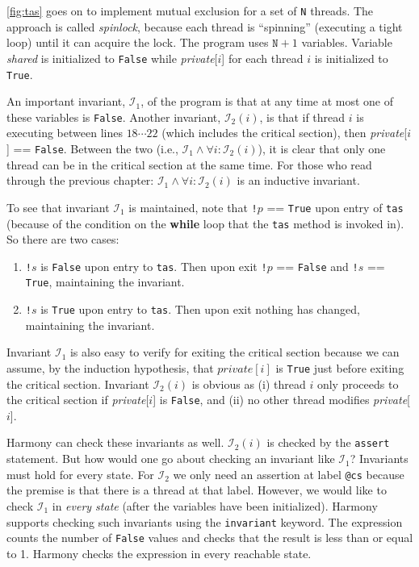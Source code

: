 \documentclass{report}
\begin{document}
\autoref{fig:tas} goes on to implement mutual exclusion for
a set of \texttt{N} threads.
The approach is called \emph{spinlock},
%
because each thread is ``spinning'' (executing a tight loop) until
it can acquire the lock.
The program uses $\mathtt{N}+1$ variables.
Variable \textit{shared} is initialized to \texttt{False} while
\textit{private}[$i$] for each thread $i$ is initialized to \texttt{True}.

An important invariant, $\mathcal{I}_1$, of the program is that at any time at most
one of these variables is \texttt{False}.
Another invariant, $\mathcal{I}_2(i)$, is that if thread $i$ is executing between
lines $18 \cdots 22$ (which includes the critical section),
then \textit{private}[$i$] == \texttt{False}.
Between the two (i.e., $\mathcal{I}_1 \land \forall i: \mathcal{I}_2(i)$),
it is clear that only one thread can be in the
critical section at the same time.
For those who read through the previous chapter:
$\mathcal{I}_1 \land \forall i: \mathcal{I}_2(i)$ is an inductive invariant.

To see that invariant $\mathcal{I}_1$ is maintained, note that
\texttt{!}$p$ == \texttt{True} upon entry of \texttt{tas}
(because of the condition on the \textbf{while} loop that the
\texttt{tas} method is invoked in).
So there are two cases:
\begin{enumerate}
\item \texttt{!}$s$ is \texttt{False} upon entry to \texttt{tas}.
Then upon exit \texttt{!}$p$ == \texttt{False} and \texttt{!}$s$ == \texttt{True},
maintaining the invariant.
\item \texttt{!}$s$ is \texttt{True} upon entry to \texttt{tas}.
Then upon exit nothing has changed, maintaining the invariant.
\end{enumerate}
Invariant $\mathcal{I}_1$ is also easy to verify for exiting the critical section
because we can assume, by the induction hypothesis, that $\textit{private}[i]$ is
\texttt{True} just before exiting the critical section.
Invariant $\mathcal{I}_2(i)$ is obvious as (i) thread $i$ only proceeds to the critical
section if \textit{private}[$i$] is \texttt{False}, and (ii) no other thread modifies
\textit{private}[$i$].

Harmony can check these invariants as well.
$\mathcal{I}_2(i)$ is checked by the \texttt{assert} statement.
But how would one go about checking an
invariant like $\mathcal{I}_1$?  Invariants must hold for every state.
For $\mathcal{I}_2$ we only need an assertion at label \texttt{@cs} because the
premise is that there is a thread at that label.  However, we would
like to check $\mathcal{I}_1$ in \emph{every state} (after the variables have
been initialized).
Harmony supports checking such invariants using the \texttt{invariant}
keyword.
The expression counts the number of \texttt{False} values and checks that
the result is less than or equal to 1.
Harmony checks the expression in every reachable state.
\end{document}
